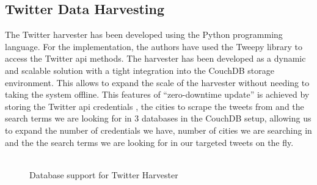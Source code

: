 \documentclass[11pt, oneside]{article}
\begin{document}
\subsection{Twitter Data Harvesting}
\label{sec:twitter_data_harvesting}
The Twitter harvester has been developed using the Python programming language. For the implementation, the authors have used the Tweepy library \citep{tweepy} to access the Twitter \acrshort{api} methods. The harvester has been developed as a dynamic and scalable solution with a tight integration into the  CouchDB storage environment. This allows to expand the scale of the harvester without needing to taking the system offline. 
\newline
This features of \enquote{zero-downtime update} is achieved by storing the Twitter \acrshort{api} credentials , the cities to scrape the tweets from and the search terms we are looking for in 3 databases  in the CouchDB setup, allowing us to expand  the number of credentials we have, number of cities we are searching in and the the search terms we are looking for in our targeted tweets on the fly. \\\\
\begin{figure}
  \begin{center}
  \end{center}
  \caption{Database support for Twitter Harvester}
  \label{fig:Database support for Twitter Harvester}
\end{figure}
\end{document}
